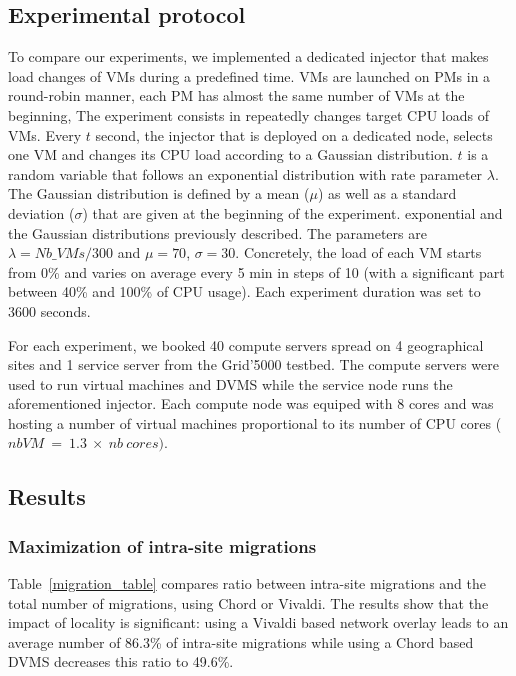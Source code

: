 \subsection{Experimental protocol}
To compare our experiments, we implemented a dedicated injector that makes load
changes of VMs during a predefined time.  VMs are launched on PMs in a
round-robin manner, \ie each PM has almost the same number of VMs at the
beginning, The experiment consists in  repeatedly changes target CPU loads of
VMs.  Every $t$ second, the injector that is deployed on a dedicated node,
selects one VM and changes its CPU load according to a Gaussian distribution.
$t$ is a random variable that follows an exponential distribution with rate
parameter $\lambda$. The Gaussian distribution is defined by a mean ($\mu$) as
well as a standard deviation ($\sigma$) that are given at the beginning of the
experiment. 
exponential and the Gaussian distributions previously described. 
The parameters are $\lambda=\mathit{Nb\_VMs}/300$ and $\mu=70$, $\sigma=30$.
Concretely, the load of each VM starts from 0\% and varies on average every 5
min in steps of 10 (with a significant part between 40\% and 100\% of CPU
usage).   Each experiment duration was set to 3600 seconds.

For each experiment, we booked 40 compute servers spread on 4 geographical sites
and 1 service server from the Grid'5000 testbed. The compute servers were used 
to run virtual machines and DVMS while the service node runs the aforementioned
injector.
%
Each compute node was equiped with 8 cores and was hosting a number of virtual
machines proportional to its number of CPU cores
 ($nb VM\ =\ 1.3\ \times\ nb\ cores)$. 

\subsection{Results}

\subsubsection{Maximization of intra-site migrations}

Table~\ref{migration_table} compares ratio between intra-site migrations and the
total number of migrations, using Chord or Vivaldi. The results show that the impact of locality is
significant: using a Vivaldi based network overlay leads to an average number of
86.3\% of intra-site migrations while using a Chord based DVMS decreases this
ratio to 49.6\%.

